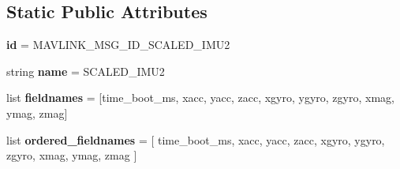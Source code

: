 \subsection*{Static Public Attributes}
\begin{DoxyCompactItemize}
\item 
\mbox{\label{classpymavlink_1_1dialects_1_1v10_1_1MAVLink__scaled__imu2__message_a3e9efa01e73a026b8e92f7cc881b039e}} 
{\bfseries id} = M\+A\+V\+L\+I\+N\+K\+\_\+\+M\+S\+G\+\_\+\+I\+D\+\_\+\+S\+C\+A\+L\+E\+D\+\_\+\+I\+M\+U2
\item 
\mbox{\label{classpymavlink_1_1dialects_1_1v10_1_1MAVLink__scaled__imu2__message_a39dcfc3203ba631314c10d70c9dbfc3c}} 
string {\bfseries name} = \textquotesingle{}S\+C\+A\+L\+E\+D\+\_\+\+I\+M\+U2\textquotesingle{}
\item 
\mbox{\label{classpymavlink_1_1dialects_1_1v10_1_1MAVLink__scaled__imu2__message_aa6719cd9d28198ab0eae099c3892cd46}} 
list {\bfseries fieldnames} = \mbox{[}\textquotesingle{}time\+\_\+boot\+\_\+ms\textquotesingle{}, \textquotesingle{}xacc\textquotesingle{}, \textquotesingle{}yacc\textquotesingle{}, \textquotesingle{}zacc\textquotesingle{}, \textquotesingle{}xgyro\textquotesingle{}, \textquotesingle{}ygyro\textquotesingle{}, \textquotesingle{}zgyro\textquotesingle{}, \textquotesingle{}xmag\textquotesingle{}, \textquotesingle{}ymag\textquotesingle{}, \textquotesingle{}zmag\textquotesingle{}\mbox{]}
\item 
\mbox{\label{classpymavlink_1_1dialects_1_1v10_1_1MAVLink__scaled__imu2__message_a4b250148f7113bdb1b8655abd6023618}} 
list {\bfseries ordered\+\_\+fieldnames} = \mbox{[} \textquotesingle{}time\+\_\+boot\+\_\+ms\textquotesingle{}, \textquotesingle{}xacc\textquotesingle{}, \textquotesingle{}yacc\textquotesingle{}, \textquotesingle{}zacc\textquotesingle{}, \textquotesingle{}xgyro\textquotesingle{}, \textquotesingle{}ygyro\textquotesingle{}, \textquotesingle{}zgyro\textquotesingle{}, \textquotesingle{}xmag\textquotesingle{}, \textquotesingle{}ymag\textquotesingle{}, \textquotesingle{}zmag\textquotesingle{} \mbox{]}
\item 

\end{DoxyCompactItemize}
